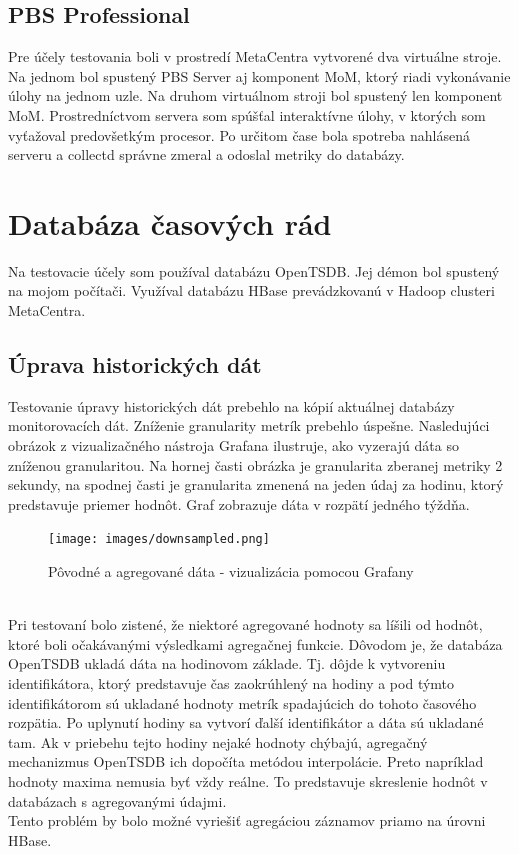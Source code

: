 \documentclass[printed,11pt,twoside,color,cover,table]{fithesis3}
\begin{document}
\subsection{PBS Professional}
Pre účely testovania boli v prostredí MetaCentra vytvorené dva virtuálne stroje. Na jednom bol spustený PBS Server aj komponent MoM,
ktorý riadi vykonávanie úlohy na jednom uzle. Na druhom virtuálnom stroji bol spustený len komponent MoM. Prostredníctvom servera
som spúšťal interaktívne úlohy, v ktorých som vyťažoval predovšetkým procesor. Po určitom čase bola spotreba nahlásená serveru a 
collectd správne zmeral a odoslal metriky do databázy.

\section{Databáza časových rád}
\label{sec:database}
Na testovacie účely som používal databázu OpenTSDB. Jej démon bol spustený na mojom počítači. Využíval databázu HBase prevádzkovanú 
v Hadoop clusteri MetaCentra.

\subsection{Úprava historických dát}
Testovanie úpravy historických dát prebehlo na kópií aktuálnej databázy monitorovacích dát. Zníženie granularity metrík prebehlo úspešne.
Nasledujúci obrázok z vizualizačného nástroja Grafana ilustruje, ako vyzerajú dáta so zníženou granularitou. Na hornej časti obrázka je 
granularita zberanej metriky 2 sekundy, na spodnej časti je granularita zmenená na jeden údaj za hodinu, ktorý predstavuje priemer hodnôt.
Graf zobrazuje dáta v rozpätí jedného týždňa.
\begin{figure}[p]
\begin{center} 
       \texttt{[image: images/downsampled.png]}
       \caption{Pôvodné a agregované dáta - vizualizácia pomocou Grafany}
\end{center}
\end{figure}
\\Pri testovaní bolo zistené, že niektoré agregované hodnoty sa líšili od hodnôt, ktoré boli očakávanými výsledkami agregačnej funkcie.
Dôvodom je, že databáza OpenTSDB ukladá dáta na hodinovom základe. Tj. dôjde k vytvoreniu identifikátora, ktorý predstavuje čas
zaokrúhlený na hodiny a pod týmto identifikátorom sú ukladané hodnoty metrík spadajúcich do tohoto časového rozpätia. Po
uplynutí hodiny sa vytvorí ďalší identifikátor a dáta sú ukladané tam. Ak v priebehu tejto hodiny nejaké hodnoty chýbajú,
agregačný mechanizmus OpenTSDB ich dopočíta metódou interpolácie. Preto napríklad hodnoty maxima nemusia byť vždy reálne.
To predstavuje skreslenie hodnôt v databázach s agregovanými údajmi. 
\\Tento problém by bolo možné vyriešiť agregáciou záznamov priamo na úrovni HBase.
\end{document}
